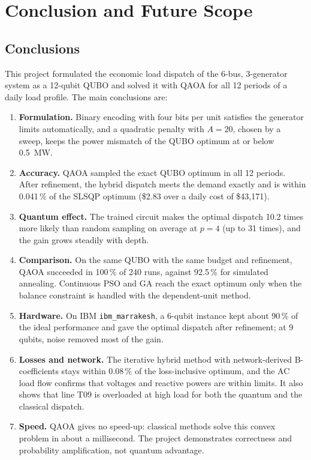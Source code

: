 \chapter{Conclusion and Future Scope}

\section{Conclusions}
This project formulated the economic load dispatch of the 6-bus, 3-generator system as a 12-qubit QUBO and solved it with QAOA for all 12 periods of a daily load profile. The main conclusions are:
\begin{enumerate}
\item \textbf{Formulation.} Binary encoding with four bits per unit satisfies the generator limits automatically, and a quadratic penalty with $A = 20$, chosen by a sweep, keeps the power mismatch of the QUBO optimum at or below 0.5~MW.
\item \textbf{Accuracy.} QAOA sampled the exact QUBO optimum in all 12 periods. After refinement, the hybrid dispatch meets the demand exactly and is within 0.041\,\% of the SLSQP optimum (\$2.83 over a daily cost of \$43{,}171).
\item \textbf{Quantum effect.} The trained circuit makes the optimal dispatch 10.2 times more likely than random sampling on average at $p = 4$ (up to 31 times), and the gain grows steadily with depth.
\item \textbf{Comparison.} On the same QUBO with the same budget and refinement, QAOA succeeded in 100\,\% of 240 runs, against 92.5\,\% for simulated annealing. Continuous PSO and GA reach the exact optimum only when the balance constraint is handled with the dependent-unit method.
\item \textbf{Hardware.} On IBM \texttt{ibm\_marrakesh}, a 6-qubit instance kept about 90\,\% of the ideal performance and gave the optimal dispatch after refinement; at 9 qubits, noise removed most of the gain.
\item \textbf{Losses and network.} The iterative hybrid method with network-derived B-coefficients stays within 0.08\,\% of the loss-inclusive optimum, and the AC load flow confirms that voltages and reactive powers are within limits. It also shows that line T09 is overloaded at high load for both the quantum and the classical dispatch.
\item \textbf{Speed.} QAOA gives no speed-up: classical methods solve this convex problem in about a millisecond. The project demonstrates correctness and probability amplification, not quantum advantage.
\end{enumerate}

